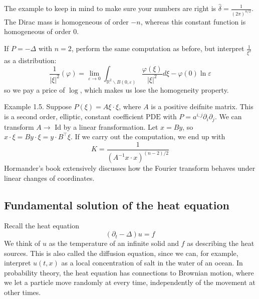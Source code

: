 The example to keep in mind to make sure your numbers are right is $\widehat{\delta}=\frac{1}{(2 \pi)^{n / 2}}$. The Dirac mass is homogeneous of order $-n$, whereas this constant function is homogeneous of order 0.

\begin{example}
    If $P=-\Delta$ with $n=2$, perform the same computation as before, but interpret $\frac{1}{\xi^{2}}$ as a distribution:
    $$
    \frac{1}{|\xi|^{2}}(\varphi)=\lim _{\varepsilon \rightarrow 0} \int_{\mathbb{R}^{2} \backslash B(0, \varepsilon)} \frac{\varphi(\xi)}{|\xi|^{2}} d \xi-\varphi(0) \ln \varepsilon
    $$
    so we pay a price of $\log$, which makes us lose the homogeneity property.
\end{example}

\begin{example}
    Example 1.5. Suppose $P(\xi)=A \xi \cdot \xi$, where $A$ is a positive deifnite matrix. This is a second order, elliptic, constant coefficient $\mathrm{PDE}$ with $P=a^{i, j} \partial_{i} \partial_{j} .$ We can transform $A \rightarrow$ Id by a linear fransformation. Let $x=B y$, so $x \cdot \xi=B y \cdot \xi=y \cdot B^{\top} \xi .$ If we carry out the computation, we end up with
    $$
    K=\frac{1}{\left(A^{-1} x \cdot x\right)^{(n-2) / 2}}
    $$
    Hormander's book extensively discusses how the Fourier transform behaves under linear changes of coordinates.
\end{example}

\subsection{Fundamental solution of the heat equation}
Recall the heat equation
$$
\left(\partial_{t}-\Delta\right) u=f
$$
We think of $u$ as the temperature of an infinite solid and $f$ as describing the heat sources. This is also called the diffusion equation, since we can, for example, interpret $u(t, x)$ as a local concentration of salt in the water of an ocean. In probability theory, the heat equation has connections to Brownian motion, where we let a particle move randomly at every time, independently of the movement at other times.

